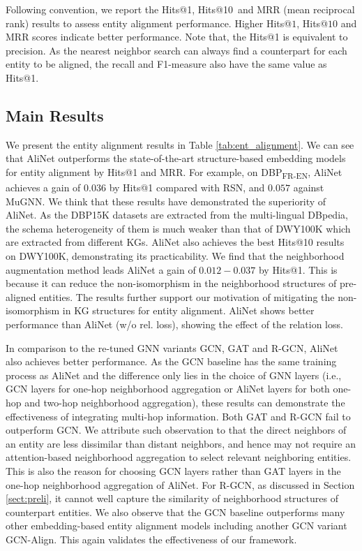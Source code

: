 \documentclass[letterpaper]{article} \usepackage{aaai20}  \usepackage{times}  \usepackage{helvet} \usepackage{courier}  \usepackage[hyphens]{url}  \usepackage{graphicx} \urlstyle{rm} \def\UrlFont{\rm}  \frenchspacing  \setlength{\pdfpagewidth}{8.5in}  \setlength{\pdfpageheight}{11in}  \usepackage{amsmath}
\begin{document}
Following convention, we report the Hits@1, Hits@10~and MRR (mean reciprocal rank) results to assess entity alignment performance. Higher Hits@$1$, Hits@$10$ and MRR scores indicate better performance. Note that, the Hits@1 is equivalent to precision. As the nearest neighbor search can always find a counterpart for each entity to be aligned, the recall and F1-measure also have the same value as Hits@1. 

\subsection{Main Results}
We present the entity alignment results in Table \ref{tab:ent_alignment}. We can see that AliNet outperforms the state-of-the-art structure-based embedding models for entity alignment by Hits@1 and MRR. For example, on DBP\textsubscript{FR-EN}, AliNet achieves a gain of $0.036$ by Hits@1 compared with RSN, and $0.057$ against MuGNN. We think that these results have demonstrated the superiority of AliNet. As the DBP15K datasets are extracted from the multi-lingual DBpedia, the schema heterogeneity of them is much weaker than that of DWY100K which are extracted from different KGs. AliNet also achieves the best Hits@10 results on DWY100K, demonstrating its practicability. We find that the neighborhood augmentation method leads AliNet a gain of $0.012-0.037$ by Hits@1. This is because it can reduce the non-isomorphism in the neighborhood structures of pre-aligned entities. The results further support our motivation of mitigating the non-isomorphism in KG structures for entity alignment. AliNet shows better performance than AliNet (w/o rel. loss), showing the effect of the relation loss.
 
In comparison to the re-tuned GNN variants GCN, GAT and R-GCN, AliNet also achieves better performance. As the GCN baseline has the same training process as AliNet and the difference only lies in the choice of GNN layers (i.e., GCN layers for one-hop neighborhood aggregation or AliNet layers for both one-hop and two-hop neighborhood aggregation), these results can demonstrate the effectiveness of integrating multi-hop information. Both GAT and R-GCN fail to outperform GCN. We attribute such observation to that the direct neighbors of an entity are less dissimilar than distant neighbors, and hence may not require an attention-based neighborhood aggregation to select relevant neighboring entities. This is also the reason for choosing GCN layers rather than GAT layers in the one-hop neighborhood aggregation of AliNet. For R-GCN, as discussed in Section \ref{sect:preli}, it cannot well capture the similarity of neighborhood structures of counterpart entities.  We also observe that the GCN baseline outperforms many other embedding-based entity alignment models including another GCN variant GCN-Align. This again validates the effectiveness of our framework. 
\end{document}
